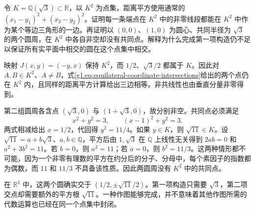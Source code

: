 \begin{exercise}\label{g1:ex:one-circle-construction-not-all}
	令 \(K=\mathbb Q(\sqrt3)\subset\mathbb R\)，以 \(K^2\) 为点集，距离平方使用通常的 \((x_1-y_1)^2+(x_2-y_2)^2\)。证明每一条端点在 \(K^2\) 中的非零线段都能在 \(K^2\) 中作为某个等边三角形的一边。再证明以 \((0,0)\)、\((1,0)\) 为圆心、共同半径为 \(\sqrt3\) 的两个圆周，在 \(K^2\) 中各自非空却没有共同点。解释为什么完成第一项构造仍不足以保证所有实平面中相交的圆在这个点集中相交。
\end{exercise}
\begin{solution}
	映射 \(J(x,y)=(-y,x)\) 保持 \(K^2\)，而 \(1/2\)、\(\sqrt3/2\) 都属于 \(K\)。因此对 \(A,B\in K^2\)、\(A\ne B\)，式\eqref{g1:eq:equilateral-coordinate-intersections}给出的两个点仍在 \(K^2\) 内，且同样的距离平方计算给出三边相等。非共线性也由垂直分量非零得到。

	第二组圆周各含点 \((\sqrt3,0)\) 与 \((1+\sqrt3,0)\)，故分别非空。共同点必须满足
	\[
		x^2+y^2=3,\qquad (x-1)^2+y^2=3.
	\]
	两式相减给出 \(x=1/2\)，代回得 \(y^2=11/4\)。如果 \(y\in K\)，则 \(\sqrt{11}\in K\)。设 \(\sqrt{11}=a+b\sqrt3\)、\(a,b\in\mathbb Q\)，平方后由 \(1,\sqrt3\) 在 \(\mathbb Q\) 上线性无关得到 \(2ab=0\) 和 \(a^2+3b^2=11\)。若 \(b=0\)，则 \(a^2=11\)；若 \(a=0\)，则 \(b^2=11/3\)。这两种情形都不可能，因为一个非零有理数的平方在约分后的分子、分母中，每个素因子的指数都为偶数，而 \(11\) 和 \(11/3\) 不具备该性质。因此两圆周没有 \(K^2\) 中的共同点。

	在 \(\mathbb R^2\) 中，这两个圆确实交于 \((1/2,\pm\sqrt{11}/2)\)。第一项构造只需要 \(\sqrt3\)，第二项交点却需要额外的平方根 \(\sqrt{11}\)。一种作图能够完成，并不意味着其他作图所需的代数运算也已经在同一个点集中封闭。
\end{solution}

